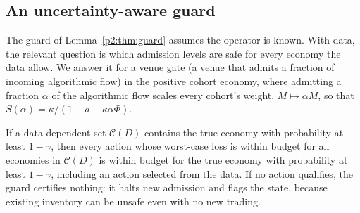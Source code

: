     \subsection{An uncertainty-aware guard}\label{p2:sec:robustguard}
The guard of Lemma~\ref{p2:thm:guard} assumes the operator is known. With data, the relevant question is which admission levels are safe for every economy the data allow. We answer it for a venue gate (a venue that admits a fraction of incoming algorithmic flow) in the positive cohort economy, where admitting a fraction $\alpha$ of the algorithmic flow scales every cohort's weight, $M\mapsto\alpha M$, so that $S(\alpha)=\kappa/(1-a-\kappa\alpha\Phi)$.

\begin{lemma}\label{p2:lem:sound}
If a data-dependent set $\mathcal C(D)$ contains the true economy with probability at least $1-\gamma$, then every action whose worst-case loss is within budget for all economies in $\mathcal C(D)$ is within budget for the true economy with probability at least $1-\gamma$, including an action selected from the data. If no action qualifies, the guard certifies nothing: it halts new admission and flags the state, because existing inventory can be unsafe even with no new trading.
\end{lemma}

